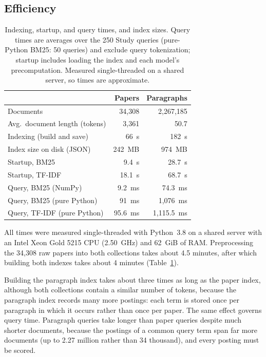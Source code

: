 \documentclass[sigconf,nonacm]{acmart}
\begin{document}
\subsection{Efficiency}
\label{sec:efficiency}
\begin{table}[t]
  \caption{Indexing, startup, and query times, and index sizes. Query
    times are averages over the 250 Study queries (pure-Python BM25: 50
    queries) and exclude query tokenization; startup includes loading the
    index and each model's precomputation. Measured single-threaded on a
    shared server, so times are approximate.}
  \label{tab:efficiency}
  \small
  \begin{tabular}{lrr}
    \toprule
    & Papers & Paragraphs \\
    \midrule
    Documents                    & 34,308      & 2,267,185 \\
    Avg.\ document length (tokens) & 3,361     & 50.7 \\
    \midrule
    Indexing (build and save)    & 66~s        & 182~s \\
    Index size on disk (JSON)    & 242~MB      & 974~MB \\
    Startup, BM25                & 9.4~s       & 28.7~s \\
    Startup, TF-IDF              & 18.1~s      & 68.7~s \\
    \midrule
    Query, BM25 (NumPy)          & 9.2~ms      & 74.3~ms \\
    Query, BM25 (pure Python)    & 91~ms       & 1,076~ms \\
    Query, TF-IDF (pure Python)  & 95.6~ms     & 1,115.5~ms \\
    \bottomrule
  \end{tabular}
\end{table}

All times were measured single-threaded with Python~3.8 on a shared
server with an Intel Xeon Gold 5215 CPU (2.50~GHz) and 62~GiB of RAM.
Preprocessing the 34,308 raw papers into both collections takes about
4.5 minutes, after which building both indexes takes about 4 minutes
(Table~\ref{tab:efficiency}).

Building the paragraph index takes about three times as long as the paper
index, although both collections contain a similar number of tokens,
because the paragraph index records many more postings: each term is
stored once per paragraph in which it occurs rather than once per paper.
The same effect governs query time. Paragraph queries take longer than
paper queries despite much shorter documents, because the postings of a
common query term span far more documents (up to 2.27 million rather
than 34 thousand), and every posting must be scored.
\end{document}
